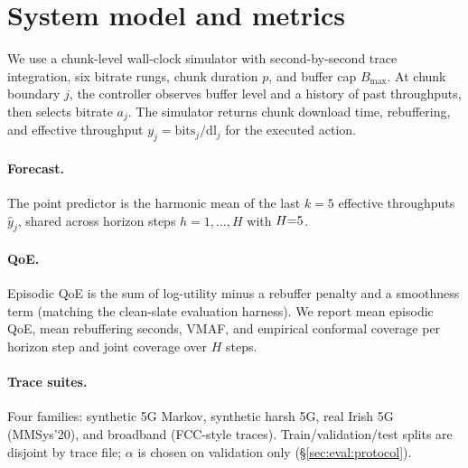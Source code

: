 \section{System model and metrics}
\label{sec:system}

We use a chunk-level wall-clock simulator with second-by-second trace integration, six bitrate rungs, chunk duration \(p\), and buffer cap \(B_{\max}\).
At chunk boundary \(j\), the controller observes buffer level and a history of past throughputs, then selects bitrate \(a_j\).
The simulator returns chunk download time, rebuffering, and effective throughput \(y_j = \mathrm{bits}_j / \mathrm{dl}_j\) for the executed action.

\paragraph{Forecast.}
The point predictor is the harmonic mean of the last \(k{=}5\) effective throughputs \(\hat y_j\), shared across horizon steps \(h=1,\ldots,H\) with \(H{=}5\).

\paragraph{QoE.}
Episodic QoE is the sum of log-utility minus a rebuffer penalty and a smoothness term (matching the clean-slate evaluation harness).
We report mean episodic QoE, mean rebuffering seconds, VMAF, and empirical conformal coverage per horizon step and joint coverage over \(H\) steps.

\paragraph{Trace suites.}
Four families: synthetic \mbox{5G} Markov, synthetic harsh \mbox{5G}, real Irish \mbox{5G} (MMSys'20), and broadband (FCC-style traces).
Train/validation/test splits are disjoint by trace file; \(\alpha\) is chosen on validation only (\S\ref{sec:eval:protocol}).
